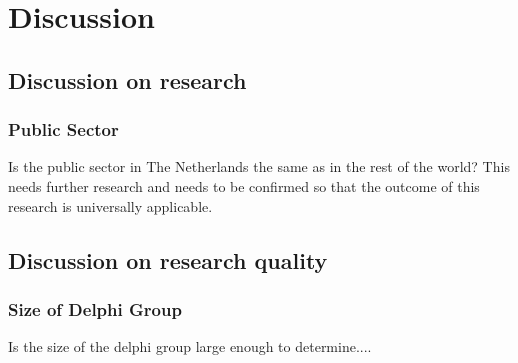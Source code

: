 \chapter{Discussion}
\label{ch:discussion}


\section{Discussion on research}
\label{sec:discussiononresearch}


\subsection{Public Sector}
\label{sub:discussionpublicsector}
Is the public sector in The Netherlands the same as in the rest of the world? This needs further research and needs to be confirmed so that the outcome of this research is universally applicable.

\section{Discussion on research quality}
\label{sec:discusssionresearchquality}
\subsection{Size of Delphi Group}
\label{sub:discussionsizeofdelphi}
Is the size of the delphi group large enough to determine....